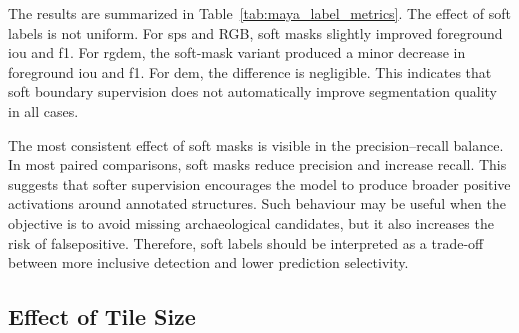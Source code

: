 The results are summarized in Table~\ref{tab:maya_label_metrics}. The effect of soft labels is not uniform. For \gls{sps} and RGB, soft masks slightly improved foreground \gls{iou} and \gls{f1}. For \gls{rgdem}, the soft-mask variant produced a minor decrease in foreground \gls{iou} and \gls{f1}. For \gls{dem}, the difference is negligible. This indicates that soft boundary supervision does not automatically improve segmentation quality in all cases.

\begin{table}[H]
    \centering
    \caption{Comparison of hard- and soft-label representations on the Maya dataset}
    \label{tab:maya_label_metrics}
    \scriptsize
    \setlength{\tabcolsep}{3.5pt}
    \renewcommand{\arraystretch}{1.15}
\end{table}

The most consistent effect of soft masks is visible in the precision--recall balance. In most paired comparisons, soft masks reduce precision and increase recall. This suggests that softer supervision encourages the model to produce broader positive activations around annotated structures. Such behaviour may be useful when the objective is to avoid missing archaeological candidates, but it also increases the risk of \gls{falsepositive}. Therefore, soft labels should be interpreted as a trade-off between more inclusive detection and lower prediction selectivity.

\subsection{Effect of Tile Size}

